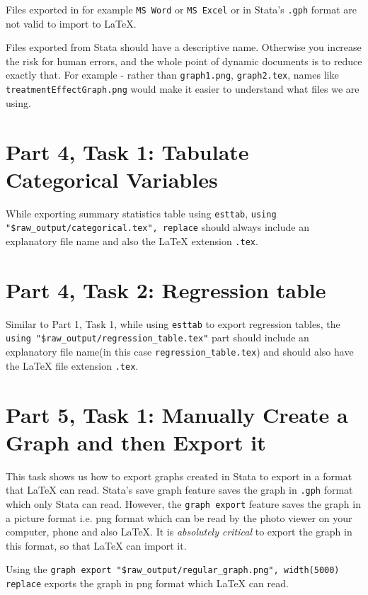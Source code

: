 \documentclass[]{article}
\begin{document}
Files exported in for example \texttt{MS Word} or \texttt{MS Excel} or in Stata's \texttt{.gph} format are not valid to import to {\LaTeX}.

Files exported from Stata should have a descriptive name. Otherwise you increase the risk for human errors, and the whole point of dynamic documents is to reduce exactly that. For example - rather than \texttt{graph1.png}, \texttt{graph2.tex}, names like \texttt{treatmentEffectGraph.png} would make it easier to understand what files we are using.

\section*{Part 4, Task 1: Tabulate Categorical Variables}

While exporting summary statistics table using \texttt{esttab}, \verb|using 	"$raw_output/categorical.tex", replace| should always include an explanatory file name and also the {\LaTeX} extension \texttt{.tex}.

\section*{Part 4, Task 2: Regression table}

Similar to Part 1, Task 1, while using \texttt{esttab} to export regression tables, the \verb|using "$raw_output/regression_table.tex"| part should include an explanatory file name(in this case \texttt{regression\_table.tex}) and should also have the {\LaTeX} file extension \texttt{.tex}.

\section*{Part 5, Task 1: Manually Create a Graph and then Export it}

This task shows us how to export graphs created in Stata to export in a format that {\LaTeX} can read. Stata's save graph feature saves the graph in \texttt{.gph} format which only Stata can read. However, the \texttt{graph export} feature  saves the graph in a picture format i.e. png format which can be read by the photo viewer on your computer, phone and also {\LaTeX}. It is \emph{absolutely critical} to export the graph in this format, so that {\LaTeX} can import it. 

Using the \verb|graph export "$raw_output/regular_graph.png", width(5000) replace| 
exports the graph in png format which {\LaTeX} can read.
\end{document}
